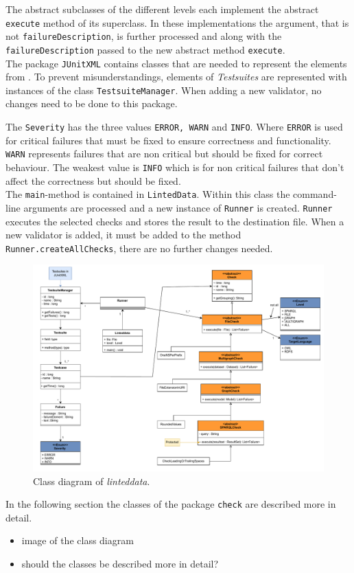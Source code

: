 \documentclass[11pt,a4paper]{article}
\newcommand{\function}[1]{\texttt{#1}}
\newcommand{\argument}[1]{\texttt{#1}}
\newcommand{\class}[1]{\texttt{#1}}
\newcommand{\enum}[1]{\texttt{#1}}
\newcommand{\package}[1]{\texttt{#1}}
\newcommand{\toolname}{\textit{linteddata}}
\begin{document}
The abstract subclasses of the different levels each implement the abstract \texttt{execute} method of its superclass. 
In these implementations the argument, that is not \argument{failureDescription}, is further processed and along with the \argument{failureDescription} passed to the new abstract method \function{execute}.
\\
The package \package{JUnitXML} contains classes that are needed to represent the elements from \cite{JUnitXML_ibm}. 
To prevent misunderstandings, elements of \textit{Testsuites} are represented with instances of the class \class{TestsuiteManager}. 
When adding a new validator, no changes need to be done to this package. 

The \enum{Severity} has the three values \enum{ERROR, WARN} and \enum{INFO}. 
Where \enum{ERROR} is used for critical failures that must be fixed to ensure correctness and functionality. 
\enum{WARN} represents failures that are non critical but should be fixed for correct behaviour. 
The weakest value is \enum{INFO} which is for non critical failures that don't affect the correctness but should be fixed.   
\\
The \function{main}-method is contained in \class{LintedData}. 
Within this class the command-line arguments are processed and a new instance of \class{Runner} is created. 
\class{Runner} executes the selected checks and stores the result to the destination file. 
When a new validator is added, it must be added to the method \function{Runner.createAllChecks}, there are no further changes needed. 
%
\begin{landscape}
\begin{figure}[tb]
	\centering
	\includegraphics[width=\textwidth]{../graphics/class_diagram.pdf}
	\caption{Class diagram of \toolname .}
	\label{fig:general_architecture:class_diagram}
\end{figure}
\end{landscape}
%
In the following section the classes of the package \package{check} are described more in detail. 
\begin{itemize}
	\item image of the class diagram
	\item should the classes be described more in detail?
\end{itemize}
%
\end{document}
